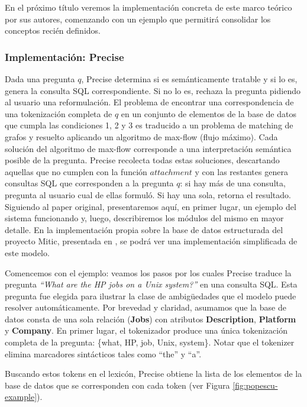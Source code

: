 En el próximo título veremos la implementación concreta de este marco teórico por sus autores, comenzando con un ejemplo que permitirá consolidar los conceptos recién definidos.

\subsubsection*{Implementación: Precise}

Dada una pregunta $q$, Precise determina si es semánticamente tratable y si lo es, genera la consulta SQL correspondiente. Si no lo es, rechaza la pregunta pidiendo al usuario una reformulación. El problema de encontrar una correspondencia de una tokenización completa de $q$ en un conjunto de elementos de la base de datos que cumpla las condiciones 1, 2 y 3 es traducido a un problema de matching de grafos y resuelto aplicando un algoritmo de max-flow (flujo máximo). Cada solución del algoritmo de max-flow corresponde a una interpretación semántica posible de la pregunta. Precise recolecta todas estas soluciones, descartando aquellas que no cumplen con la función $attachment$ y con las restantes genera consultas SQL que corresponden a la pregunta $q$: si hay más de una consulta, pregunta al usuario cual de ellas formuló. Si hay una sola, retorna el resultado.
Siguiendo al paper original, presentaremos aquí, en primer lugar, un ejemplo del sistema funcionando y, luego, describiremos los módulos del mismo en mayor detalle. En la implementación propia sobre la base de datos estructurada del proyecto Mitic, presentada en , se podrá ver una implementación simplificada de este modelo.

\medskip

Comencemos con el ejemplo: veamos los pasos por los cuales Precise traduce la pregunta \textit{``What are the HP jobs on a Unix system?''} en una consulta SQL. Esta pregunta fue elegida para ilustrar la clase de ambigüedades que el modelo puede resolver automáticamente. Por brevedad y claridad, asumamos que la base de datos consta de una sola relación (\textbf{Jobs}) con atributos \textbf{Description}, \textbf{Platform} y  \textbf{Company}. En primer lugar, el tokenizador produce una única tokenización completa de la pregunta: \{what, HP, job, Unix, system\}. Notar que el tokenizer elimina marcadores sintácticos tales como ``the'' y ``a''.

Buscando estos tokens en el lexicón, Precise obtiene la lista de los elementos de la base de datos que se corresponden con cada token (ver Figura \ref{fig:popescu-example}).

